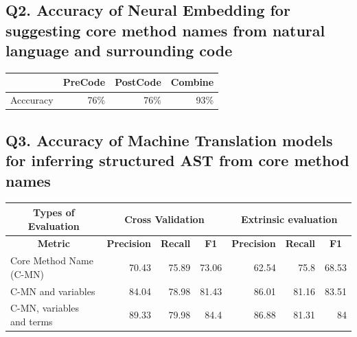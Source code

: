 \documentclass[sigconf,review,anonymous]{article}
\begin{document}
\subsection{Q2. Accuracy of Neural Embedding for suggesting core method names  from natural language and surrounding code}

\begin{table}[]
\centering
\begin{tabular}{|l|l|l|l|}
\hline
\textbf{} & \textbf{PreCode}          & \textbf{PostCode}         & \textbf{Combine}          \\ \hline
Acccuracy & \multicolumn{1}{r|}{76\%} & \multicolumn{1}{r|}{76\%} & \multicolumn{1}{r|}{93\%} \\ \hline
\end{tabular}
\end{table}

\subsection{Q3. Accuracy of Machine Translation models for inferring structured AST from core method names}

\begin{table}[]
\centering
\begin{tabular}{|l|r|r|r|r|r|r|}
\hline
\multicolumn{1}{|c|}{\textbf{Types of Evaluation}} & \multicolumn{3}{c|}{\textbf{Cross Validation}}                                                                    & \multicolumn{3}{c|}{\textbf{Extrinsic evaluation}}                                                                \\ \hline
\multicolumn{1}{|c|}{\textbf{Metric}}              & \multicolumn{1}{c|}{\textbf{Precision}} & \multicolumn{1}{c|}{\textbf{Recall}} & \multicolumn{1}{c|}{\textbf{F1}} & \multicolumn{1}{c|}{\textbf{Precision}} & \multicolumn{1}{c|}{\textbf{Recall}} & \multicolumn{1}{c|}{\textbf{F1}} \\ \hline
Core Method Name (C-MN)                            & 70.43                                   & 75.89                                & 73.06                            & 62.54                                   & 75.8                                 & 68.53                            \\ \hline
C-MN and variables                                 & 84.04                                   & 78.98                                & 81.43                            & 86.01                                   & 81.16                                & 83.51                            \\ \hline
C-MN, variables and terms                          & 89.33                                   & 79.98                                & 84.4                             & 86.88                                   & 81.31                                & 84                               \\ \hline
\end{tabular}
\end{table}
\end{document}

